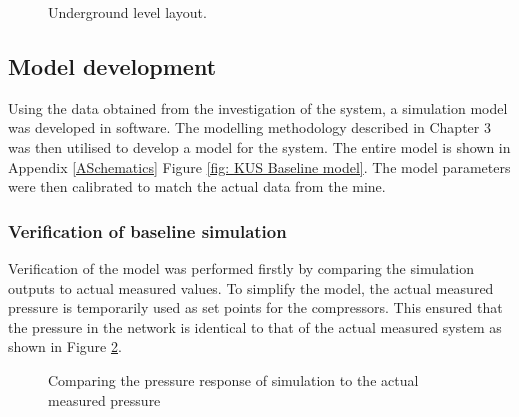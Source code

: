 	\begin{figure}[h!]
		\centering
		\caption{Underground level layout.}
		\label{fig: KUS Underground level layout}
	\end{figure}	
	\subsection{Model development}
	
	Using the data obtained from the investigation of the system, a  simulation model was developed in software. The modelling methodology described in Chapter 3 was then utilised to develop a model for the system. The entire model is shown in Appendix \ref{ASchematics} Figure \ref{fig: KUS Baseline model}. The model parameters were then calibrated to match the actual data from the mine.
	
	\subsubsection{Verification of baseline simulation}
	Verification of the model was performed firstly by comparing the simulation outputs to actual measured values. To simplify the model, the actual measured pressure is temporarily used as set points for the compressors. This ensured that the pressure in the network is identical to that of the actual measured system as shown in Figure \ref{fig: Verification Pressure kusasalethu}.
	
	\par 
	
	\begin{figure}[h]
		\centering
		\fbox{}
		\caption{Comparing the pressure response of simulation to the actual measured pressure}
		\label{fig: Verification Pressure kusasalethu}
	\end{figure}

